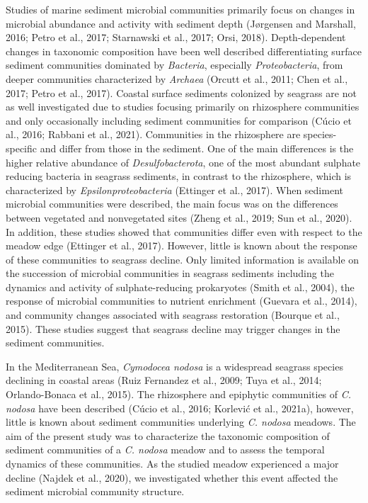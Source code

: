 \documentclass[12pt,]{article}
\begin{document}
Studies of marine sediment microbial communities primarily focus on
changes in microbial abundance and activity with sediment depth
(Jørgensen and Marshall, 2016; Petro et al., 2017; Starnawski et al.,
2017; Orsi, 2018). Depth-dependent changes in taxonomic composition have
been well described differentiating surface sediment communities
dominated by \emph{Bacteria}, especially \emph{Proteobacteria}, from
deeper communities characterized by \emph{Archaea} (Orcutt et al., 2011;
Chen et al., 2017; Petro et al., 2017). Coastal surface sediments
colonized by seagrass are not as well investigated due to studies
focusing primarily on rhizosphere communities and only occasionally
including sediment communities for comparison (Cúcio et al., 2016;
Rabbani et al., 2021). Communities in the rhizosphere are
species-specific and differ from those in the sediment. One of the main
differences is the higher relative abundance of \emph{Desulfobacterota},
one of the most abundant sulphate reducing bacteria in seagrass
sediments, in contrast to the rhizosphere, which is characterized by
\emph{Epsilonproteobacteria} (Ettinger et al., 2017). When sediment
microbial communities were described, the main focus was on the
differences between vegetated and nonvegetated sites (Zheng et al.,
2019; Sun et al., 2020). In addition, these studies showed that
communities differ even with respect to the meadow edge (Ettinger et
al., 2017). However, little is known about the response of these
communities to seagrass decline. Only limited information is available
on the succession of microbial communities in seagrass sediments
including the dynamics and activity of sulphate-reducing prokaryotes
(Smith et al., 2004), the response of microbial communities to nutrient
enrichment (Guevara et al., 2014), and community changes associated with
seagrass restoration (Bourque et al., 2015). These studies suggest that
seagrass decline may trigger changes in the sediment communities.

In the Mediterranean Sea, \emph{Cymodocea nodosa} is a widespread
seagrass species declining in coastal areas (Ruiz Fernandez et al.,
2009; Tuya et al., 2014; Orlando-Bonaca et al., 2015). The rhizosphere
and epiphytic communities of \emph{C. nodosa} have been described (Cúcio
et al., 2016; Korlević et al., 2021a), however, little is known about
sediment communities underlying \emph{C. nodosa} meadows. The aim of the
present study was to characterize the taxonomic composition of sediment
communities of a \emph{C. nodosa} meadow and to assess the temporal
dynamics of these communities. As the studied meadow experienced a major
decline (Najdek et al., 2020), we investigated whether this event
affected the sediment microbial community structure.
\end{document}
